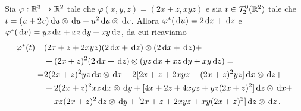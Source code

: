 \begin{example}
	Sia $\varphi:\mathbb R^3\to\mathbb R^2$ tale che $\varphi(x,y,z) = (2x+z,xyz)$ e sia $t\in \mathcal T_2^0(\mathbb R^2)$ tale che $t = (u+2v)\,\mathrm d u\otimes \,\mathrm d u + u^2 \,\mathrm d u \otimes \,\mathrm d v$.
	Allora $\varphi^*(\,\mathrm d u) = 2\,\mathrm d x +\,\mathrm d z$ e $\varphi^*(\,\mathrm d v) = yz \,\mathrm d x + xz \,\mathrm d y + xy \,\mathrm d z$, da cui ricaviamo
	\begin{align*}
	\varphi^*(t) =& (2x+z + 2xyz) (2\,\mathrm d x + \,\mathrm d z) \otimes (2\,\mathrm d x + \,\mathrm d z)+ \\
	&+ (2x+z)^2 (2\,\mathrm d x + \,\mathrm d z) \otimes (yz \,\mathrm d x + xz \,\mathrm d y + xy \,\mathrm d z) = \\
	=&2 (2x+z)^2 yz \,\mathrm d x \otimes \,\mathrm d x +  2 [2x + z + 2xyz + (2x + z)^2 yz] \,\mathrm d x \otimes \,\mathrm d z  +\\
	&+ 2 (2x+z)^2 xz \,\mathrm d x \otimes \,\mathrm d y + [4x + 2z + 4xyz + yz (2x+z)^2] \,\mathrm d z \otimes \,\mathrm d x +  \\
        &+ xz (2x+z)^2 \,\mathrm d z \otimes \,\mathrm d y + [2x + z + 2xyz + xy (2x+z)^2] \,\mathrm d z \otimes \,\mathrm d z \, \text{. }
	\end{align*}
\end{example}
